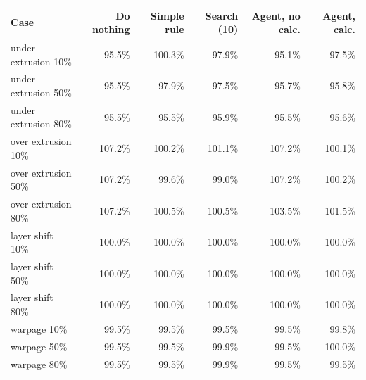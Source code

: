 \begin{tabular}{lrrrrr}
\toprule
Case & Do nothing & Simple rule & Search (10) & Agent, no calc. & Agent, calc. \\
\midrule
under extrusion 10\% & 95.5\% & 100.3\% & 97.9\% & 95.1\% & 97.5\% \\
under extrusion 50\% & 95.5\% & 97.9\% & 97.5\% & 95.7\% & 95.8\% \\
under extrusion 80\% & 95.5\% & 95.5\% & 95.9\% & 95.5\% & 95.6\% \\
over extrusion 10\% & 107.2\% & 100.2\% & 101.1\% & 107.2\% & 100.1\% \\
over extrusion 50\% & 107.2\% & 99.6\% & 99.0\% & 107.2\% & 100.2\% \\
over extrusion 80\% & 107.2\% & 100.5\% & 100.5\% & 103.5\% & 101.5\% \\
layer shift 10\% & 100.0\% & 100.0\% & 100.0\% & 100.0\% & 100.0\% \\
layer shift 50\% & 100.0\% & 100.0\% & 100.0\% & 100.0\% & 100.0\% \\
layer shift 80\% & 100.0\% & 100.0\% & 100.0\% & 100.0\% & 100.0\% \\
warpage 10\% & 99.5\% & 99.5\% & 99.5\% & 99.5\% & 99.8\% \\
warpage 50\% & 99.5\% & 99.5\% & 99.9\% & 99.5\% & 100.0\% \\
warpage 80\% & 99.5\% & 99.5\% & 99.9\% & 99.5\% & 99.5\% \\
\bottomrule
\end{tabular}
